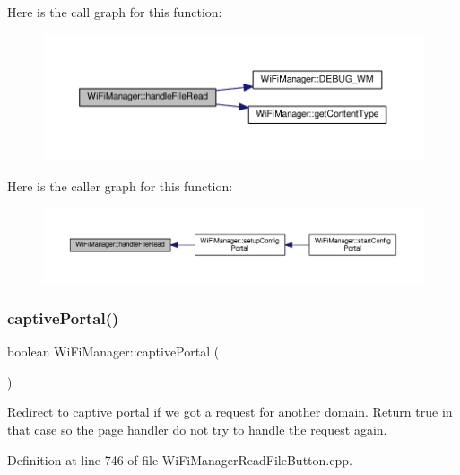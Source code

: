 Here is the call graph for this function\+:\nopagebreak
\begin{figure}[H]
\begin{center}
\leavevmode
\includegraphics[width=350pt]{d4/dc8/class_wi_fi_manager_a9e802fa4ca834a622f058a7176f47806_cgraph}
\end{center}
\end{figure}
Here is the caller graph for this function\+:\nopagebreak
\begin{figure}[H]
\begin{center}
\leavevmode
\includegraphics[width=350pt]{d4/dc8/class_wi_fi_manager_a9e802fa4ca834a622f058a7176f47806_icgraph}
\end{center}
\end{figure}
\mbox{\label{class_wi_fi_manager_a4ef4298deb224212e5242c456669a973}} 
\subsubsection{\texorpdfstring{captive\+Portal()}{captivePortal()}}
{\footnotesize\ttfamily boolean Wi\+Fi\+Manager\+::captive\+Portal (\begin{DoxyParamCaption}{ }\end{DoxyParamCaption})\hspace{0.3cm}{\ttfamily [private]}}

Redirect to captive portal if we got a request for another domain. Return true in that case so the page handler do not try to handle the request again. 

Definition at line 746 of file Wi\+Fi\+Manager\+Read\+File\+Button.\+cpp.



